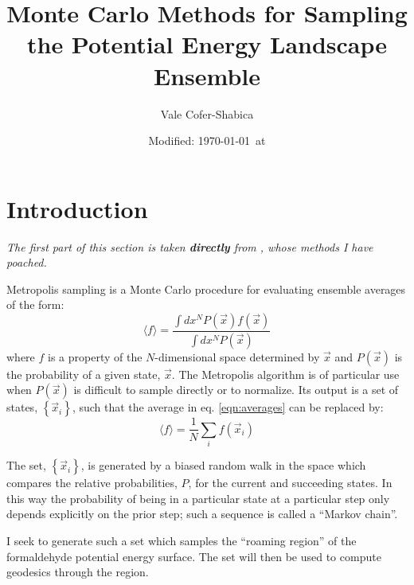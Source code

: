 \documentclass[letterpaper,12pt]{article}
\title{Monte Carlo Methods for Sampling the Potential Energy Landscape Ensemble}
\date{Modified: \today\ at \currenttime}
\author{Vale Cofer-Shabica}
\newcommand{\refeq}[1]{eq. \ref{eqn:#1}}
\begin{document}
\maketitle


\section{Introduction}
\emph{The first part of this section is taken \textbf{directly} from \cite{doll:1981}, whose methods I have poached.}

Metropolis sampling is a Monte Carlo procedure for evaluating ensemble averages of the form:
\begin{equation}\label{eqn:averages}
\langle f \rangle  = \frac{\int dx^N P(\vec{x}) f\left( \vec{x}\right)}{\int dx^N P(\vec{x})}
\end{equation}
where $f$ is a property of the $N$-dimensional space determined by $\vec{x}$ and $P(\vec{x})$ is the probability of a given state, $\vec{x}$. The Metropolis algorithm is of particular use when $P(\vec{x})$ is difficult to sample directly or to normalize. Its output is a set of states, $\left\{ \vec{x}_i \right\}$, such that the average in \refeq{averages} can be replaced by:
\begin{equation}
\langle f \rangle  = \frac{1}{N} \sum_i f\left( \vec{x}_i \right)
\end{equation}

The set, $\left\{ \vec{x}_i \right\}$, is generated by a biased random walk in the space which compares the relative probabilities, $P$, for the current and succeeding states. In this way the probability of being in a particular state at a particular step only depends explicitly on the prior step; such a sequence is called a ``Markov chain''.

I seek to generate such a set which samples the ``roaming region'' of the formaldehyde potential energy surface. The set will then be used to compute geodesics through the region.
\end{document}
